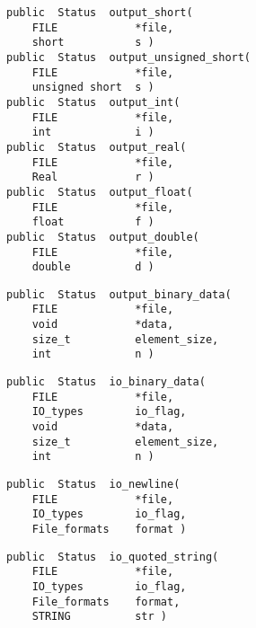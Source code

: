 
{\bf\begin{verbatim}
public  Status  output_short(
    FILE            *file,
    short           s )
public  Status  output_unsigned_short(
    FILE            *file,
    unsigned short  s )
public  Status  output_int(
    FILE            *file,
    int             i )
public  Status  output_real(
    FILE            *file,
    Real            r )
public  Status  output_float(
    FILE            *file,
    float           f )
public  Status  output_double(
    FILE            *file,
    double          d )
\end{verbatim}}


{\bf\begin{verbatim}
public  Status  output_binary_data(
    FILE            *file,
    void            *data,
    size_t          element_size,
    int             n )
\end{verbatim}}


{\bf\begin{verbatim}
public  Status  io_binary_data(
    FILE            *file,
    IO_types        io_flag,
    void            *data,
    size_t          element_size,
    int             n )
\end{verbatim}}


{\bf\begin{verbatim}
public  Status  io_newline(
    FILE            *file,
    IO_types        io_flag,
    File_formats    format )
\end{verbatim}}


{\bf\begin{verbatim}
public  Status  io_quoted_string(
    FILE            *file,
    IO_types        io_flag,
    File_formats    format,
    STRING          str )
\end{verbatim}}

